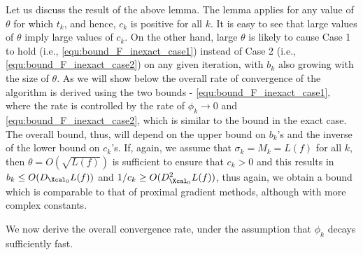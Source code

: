 \documentclass[11pt]{article}
\numberwithin{equation}{section}
\begin{document}
\begin{remark} Let us discuss the result of the above lemma. The lemma applies for any value of $\theta$ for which
$t_k$, and hence, $c_k$ is positive for all $k$.  It is easy to see that large values of  $\theta$ 
imply large values of $c_k$. On the other hand, large $\theta$ is likely to cause  Case 1 to hold (i.e., \eqref{equ:bound_F_inexact_case1}) 
instead of Case 2 (i.e., \eqref{equ:bound_F_inexact_case2}) on any given iteration, with $b_k$ also growing with the size of $\theta$. 
As we will show below the overall rate of convergence of the algorithm is derived using the two bounds - \eqref{equ:bound_F_inexact_case1}, where
the rate is controlled by the rate of $\phi_k\to 0$ and \eqref{equ:bound_F_inexact_case2}, which is similar to the bound in the exact case.
The overall bound, thus, will depend on the upper bound on $b_k$'s and the inverse of 
the lower bound on $c_k$'s. If, again, we assume that $\sigma_k=M_k=L(f)$ for all $k$, then $\theta=O(\sqrt{L(f)})$ is sufficient to ensure that $c_k>0$
and this results in $b_k\leq O(D_{\Xcal_0}L(f))$ and $1/c_k\geq O(D_{\Xcal_0}^2L(f))$, thus again, we obtain a bound which is comparable to that of proximal gradient methods, although with more complex constants. 
\end{remark}

We now derive the overall convergence rate, under the assumption that $\phi_{k}$ decays sufficiently fast. 
\end{document}
